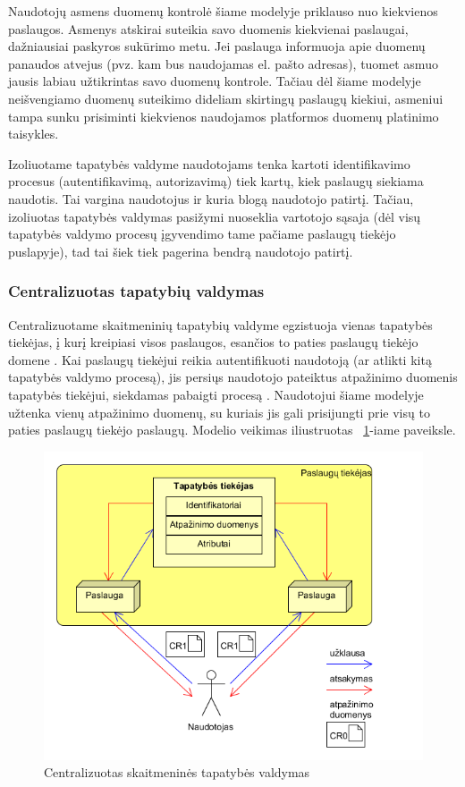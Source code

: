 Naudotojų asmens duomenų kontrolė šiame modelyje priklauso nuo kiekvienos paslaugos. Asmenys atskirai suteikia savo duomenis
kiekvienai paslaugai, dažniausiai paskyros sukūrimo metu. Jei paslauga informuoja apie duomenų panaudos atvejus (pvz. kam bus naudojamas
el. pašto adresas), tuomet asmuo jausis labiau užtikrintas savo duomenų kontrole. Tačiau dėl šiame modelyje neišvengiamo duomenų suteikimo
dideliam skirtingų paslaugų kiekiui, asmeniui tampa sunku prisiminti kiekvienos naudojamos platformos duomenų platinimo taisykles.

Izoliuotame tapatybės valdyme naudotojams tenka kartoti identifikavimo procesus (autentifikavimą, autorizavimą) tiek kartų, kiek paslaugų siekiama
naudotis. Tai vargina naudotojus ir kuria blogą naudotojo patirtį. Tačiau, izoliuotas tapatybės valdymas pasižymi nuoseklia vartotojo sąsaja (dėl 
visų tapatybės valdymo procesų įgyvendimo tame pačiame paslaugų tiekėjo puslapyje), tad tai šiek tiek pagerina bendrą naudotojo patirtį.

\subsubsection{Centralizuotas tapatybių valdymas}

Centralizuotame skaitmeninių tapatybių valdyme egzistuoja vienas tapatybės tiekėjas, į kurį kreipiasi visos paslaugos,
esančios to paties paslaugų tiekėjo domene \cite{Josang2005}. Kai paslaugų tiekėjui
reikia autentifikuoti naudotoją (ar atlikti kitą tapatybės valdymo procesą), jis persiųs naudotojo pateiktus atpažinimo duomenis tapatybės tiekėjui,
siekdamas pabaigti procesą \cite{Cao2010}. Naudotojui šiame modelyje užtenka vienų atpažinimo duomenų, su kuriais jis gali prisijungti prie visų to paties
paslaugų tiekėjo paslaugų. Modelio veikimas iliustruotas ~\ref{fig:centralisedModel}-iame paveiksle.

\begin{figure}[H]
    \centering
    \includegraphics[scale=0.8]{img/centralizedModel}
    \caption{Centralizuotas skaitmeninės tapatybės valdymas \cite{Cao2010}}
    \label{fig:centralisedModel}
\end{figure}

